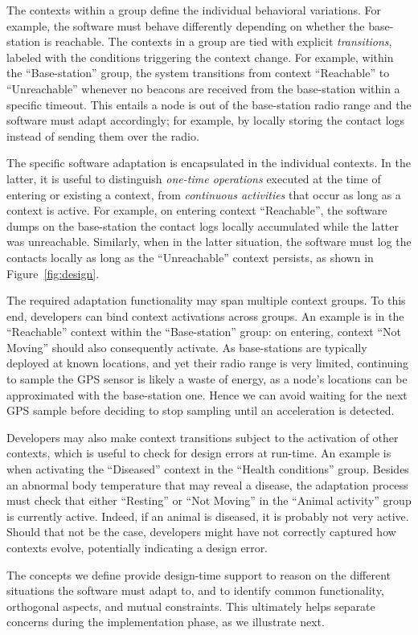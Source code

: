 The contexts within a group define the individual behavioral
variations. For example, the software must behave differently
depending on whether the base-station is reachable.  The contexts in a
group are tied with explicit \emph{transitions}, labeled with the
conditions triggering the context change. For example, within the
``Base-station'' group, the system transitions from context
``Reachable'' to ``Unreachable'' whenever no beacons are received from
the base-station within a specific timeout. This entails a node is out
of the base-station radio range and the software must adapt
accordingly; for example, by locally storing the contact logs instead
of sending them over the radio.

The specific software adaptation is encapsulated in the individual
contexts. In the latter, it is useful to distinguish \emph{one-time
  operations} executed at the time of entering or existing a context,
from \emph{continuous activities} that occur as long as a context is
active. For example, on entering context ``Reachable'', the software
dumps on the base-station the contact logs locally accumulated while
the latter was unreachable. Similarly, when in the latter situation,
the software must log the contacts locally as long as the
``Unreachable'' context persists, as shown in Figure~\ref{fig:design}.

The required adaptation functionality may span multiple context
groups. To this end, developers can bind context activations across
groups. An example is in the ``Reachable'' context within the
``Base-station'' group: on entering, context ``Not Moving'' should
also consequently activate. As base-stations are typically deployed at
known locations, and yet their radio range is very limited, continuing
to sample the GPS sensor is likely a waste of energy, as a node's
locations can be approximated with the base-station one. Hence we can
avoid waiting for the next GPS sample before deciding to stop
sampling until an acceleration is detected.

Developers may also make context transitions subject to the activation
of other contexts, which is useful to check for design errors at
run-time. An example is when activating the ``Diseased'' context in
the ``Health conditions'' group. Besides an abnormal body temperature
that may reveal a disease, the adaptation process must check that
either ``Resting'' or ``Not Moving'' in the ``Animal activity'' group
is currently active. Indeed, if an animal is diseased, it is probably
not very active. Should that not be the case, developers might have
not correctly captured how contexts evolve, potentially indicating a
design error.

The concepts we define provide design-time support to reason on the
different situations the software must adapt to, and to identify common
functionality, orthogonal aspects, and mutual constraints. This
ultimately helps separate concerns during the implementation phase, as
we illustrate next.



